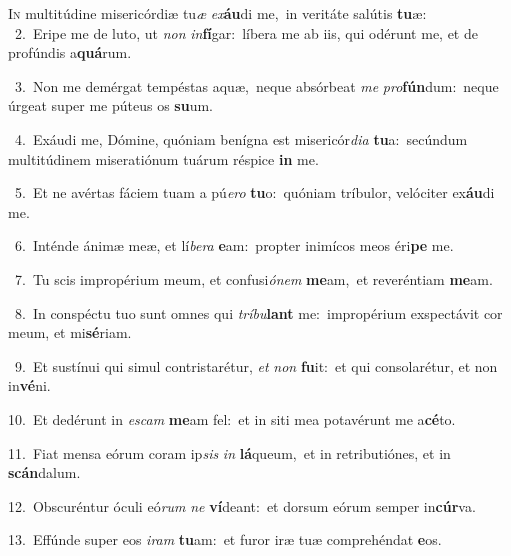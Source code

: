 \lettrine{\initial\textcolor{\initialcolor}{I}}{n} multitúdine misericórdiæ tu\textit{æ} \textit{ex}\-\textbf{áu}di me,~\star in veritáte salútis \textbf{tu}\-æ:\\
{\numbfont\textcolor{\numbcolor}{~2.}}~Eripe me de luto, ut \textit{non} \textit{in}\-\textbf{fí}gar:~\star líbera me ab iis, qui odérunt me, et de profúndis a\-\textbf{quá}\-rum.\par
{\numbfont\textcolor{\numbcolor}{~3.}}~Non me demérgat tempéstas aquæ,~\dagger neque absórbeat \textit{me} \textit{pro}\-\textbf{fún}dum:~\star neque úrgeat super me púteus os \textbf{su}\-um.\par
{\numbfont\textcolor{\numbcolor}{~4.}}~Exáudi me, Dómine, quóniam benígna est misericór\-\textit{di}\-\textit{a} \textbf{tu}\-a:~\star secúndum multitúdinem miseratiónum tuárum réspice \textbf{in} me.\par
{\numbfont\textcolor{\numbcolor}{~5.}}~Et ne avértas fáciem tuam a pú\-\textit{e}\-\textit{ro} \textbf{tu}\-o:~\star quóniam tríbulor, velóciter ex\-\textbf{áu}\-di me.\par
{\numbfont\textcolor{\numbcolor}{~6.}}~Inténde ánimæ meæ, et lí\-\textit{be}\-\textit{ra} \textbf{e}\-am:~\star propter inimícos meos éri\textbf{pe} me.\par
{\numbfont\textcolor{\numbcolor}{~7.}}~Tu scis impropérium meum, et confusi\-\textit{ó}\-\textit{nem} \textbf{me}\-am,~\star et reveréntiam \textbf{me}\-am.\par
{\numbfont\textcolor{\numbcolor}{~8.}}~In conspéctu tuo sunt omnes qui \textit{trí}\-\textit{bu}\textbf{lant} me:~\star impropérium exspectávit cor meum, et mi\-\textbf{sé}\-riam.\par
{\numbfont\textcolor{\numbcolor}{~9.}}~Et sustínui qui simul contristarétur, \textit{et} \textit{non} \textbf{fu}\-it:~\star et qui consolarétur, et non in\-\textbf{vé}\-ni.\par
{\numbfont\textcolor{\numbcolor}{10.}}~Et dedérunt in \textit{es}\-\textit{cam} \textbf{me}\-am fel:~\star et in siti mea potavérunt me a\-\textbf{cé}\-to.\par
{\numbfont\textcolor{\numbcolor}{11.}}~Fiat mensa eórum coram ip\textit{sis} \textit{in} \textbf{lá}\-queum,~\star et in retributiónes, et in \textbf{scán}\-dalum.\par
{\numbfont\textcolor{\numbcolor}{12.}}~Obscuréntur óculi eó\textit{rum} \textit{ne} \textbf{ví}\-deant:~\star et dorsum eórum semper in\-\textbf{cúr}\-va.\par
{\numbfont\textcolor{\numbcolor}{13.}}~Effúnde super eos \textit{i}\-\textit{ram} \textbf{tu}\-am:~\star et furor iræ tuæ comprehéndat \textbf{e}\-os.\par
